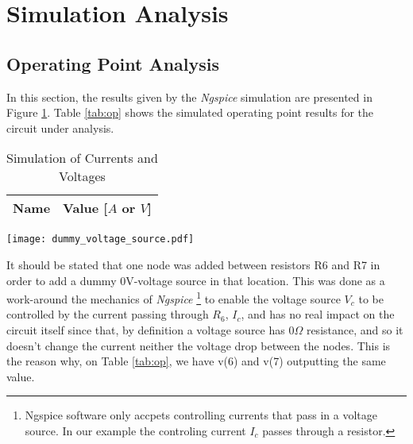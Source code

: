 \section{Simulation Analysis}
\label{sec:simulation}

\subsection{Operating Point Analysis}

In this section, the results given by the \textit{Ngspice} simulation are presented in Figure \ref{fig:alternative_circuit_for_ngspice}. Table \ref{tab:op} shows the simulated operating point results for the circuit
under analysis.

\begin{table}[h]
  \begin{minipage}{0.4\textwidth}
  \centering
  \begin{tabular}{|l|c|}
    \hline    
    {\bf Name} & {\bf Value [$A$ or $V$]} \\ \hline
    
  \end{tabular}
  \caption[Simulation of Currents and Voltages]{Simulation of Currents and Voltages\footnotemark}
  \label{tab:op}
  \end{minipage}
  \hfill
  \begin{minipage}{0.53\textwidth}
    \centering
    \texttt{[image: dummy\_voltage\_source.pdf]}
    \label{fig:alternative_circuit_for_ngspice}
  \end{minipage}
\end{table}

It should be stated that one node was added between resistors R6 and R7 in order to add a dummy 0V-voltage source in that location. This was done as a work-around the mechanics of \emph{Ngspice} \footnote{ Ngspice software only accpets controlling currents that pass in a voltage source. In our example the controling current $I_c$ passes through a resistor.} to enable the voltage source $V_c$ to be controlled by the current passing through $R_6$, $I_c$, and has no real impact on the circuit itself since that, by definition a voltage source has $0\Omega$ resistance, and so it doesn't change the current neither the voltage drop between the nodes. This is the reason why, on Table \ref{tab:op}, we have v(6) and v(7) outputting the same value.

\clearpage



